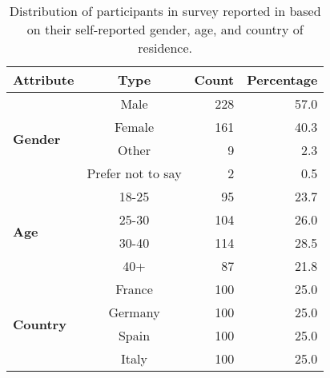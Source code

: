 \begin{table}[t]
    \centering
   \small
   \begin{tabular}{@{}lcrr@{}}
\toprule
\textbf{Attribute}                & \textbf{Type}     & \multicolumn{1}{c}{\textbf{Count}} & \multicolumn{1}{c}{\textbf{Percentage}} \\ \midrule
\multirow{4}{*}{\textbf{Gender}}  & Male              & 228                                & 57.0                                     \\
                                  & Female            & 161                                & 40.3                                   \\
                                  & Other             & 9                                  & 2.3                                    \\
                                  & Prefer not to say & 2                                  & 0.5                                     \\ \midrule
\multirow{4}{*}{\textbf{Age}}     & 18-25             & 95                                 & 23.7                                    \\
                                  & 25-30             & 104                                & 26.0                                      \\
                                  & 30-40             & 114                                & 28.5                                    \\
                                  & 40+               & 87                                 & 21.8                                    \\ \midrule
\multirow{4}{*}{\textbf{Country}} & France            & 100                                & 25.0                                      \\
                                  & Germany           & 100                                & 25.0                                      \\
                                  & Spain             & 100                                & 25.0                                      \\
                                  & Italy             & 100                                & 25.0                                      \\ \bottomrule
\end{tabular}
    \caption{Distribution of participants in survey reported in  based on their self-reported gender, age, and country of residence. }
    \label{Tab: Demographics}
\end{table}


